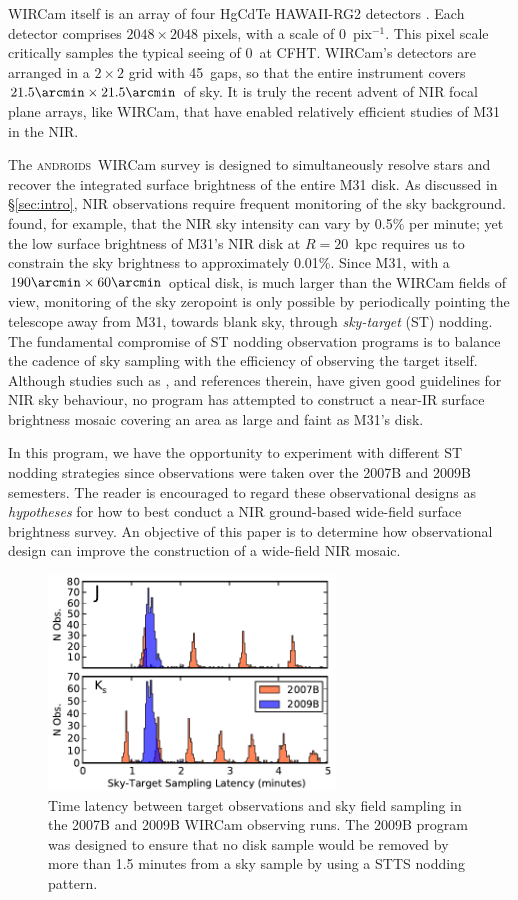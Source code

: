 \documentclass[iop]{emulateapj}
\newcommand{\androids}{\textsc{androids}}
\newcommand{\Sec}[1]{\S\ref{sec:#1}}  %
\begin{document}
WIRCam itself is an array of four HgCdTe HAWAII-RG2 detectors \citep{Puget:2004}.
Each detector comprises $2048\times 2048$ pixels, with a scale of 0~pix$^{-1}$.
This pixel scale critically samples the typical seeing of 0~at CFHT\@.
WIRCam's detectors are arranged in a $2\times 2$ grid with 45\arcsec~gaps, so that the entire instrument covers $21.5\arcmin \times 21.5\arcmin$ of sky.
It is truly the recent advent of NIR focal plane arrays, like WIRCam, that have enabled relatively efficient studies of M31 in the NIR.

The \androids\ WIRCam survey is designed to simultaneously resolve stars and recover the integrated surface brightness of the entire M31 disk.
As discussed in \Sec{intro}, NIR observations require frequent monitoring of the sky background.
\cite{Vaduvescu:2004} found, for example, that the NIR sky intensity can vary by 0.5\% per minute; yet the low surface brightness of M31's NIR disk at $R=20$~kpc requires us to constrain the sky brightness to approximately 0.01\%.
Since M31, with a $190\arcmin \times 60\arcmin$ optical disk, is much larger than the WIRCam fields of view, monitoring of the sky zeropoint is only possible by periodically pointing the telescope away from M31, towards blank sky, through \emph{sky-target} (ST) nodding. 
The fundamental compromise of ST nodding observation programs is to balance the cadence of sky sampling with the efficiency of observing the target itself.
Although studies such as \cite{Vaduvescu:2004}, and references therein, have given good guidelines for NIR sky behaviour, no program has attempted to construct a near-IR surface brightness mosaic covering an area as large and faint as M31's disk.

In this program, we have the opportunity to experiment with different ST nodding strategies since observations were taken over the 2007B and 2009B semesters.
The reader is encouraged to regard these observational designs as \emph{hypotheses} for how to best conduct a NIR ground-based wide-field surface brightness survey.
An objective of this paper is to determine how observational design can improve the construction of a wide-field NIR mosaic.

\begin{figure}[t]
\centering
\includegraphics[width=3in]{figs/sky_target_lag}
\caption{Time latency between target observations and sky field sampling in the 2007B and 2009B WIRCam observing runs.
The 2009B program was designed to ensure that no disk sample would be removed by more than 1.5 minutes from a sky sample by using a STTS nodding pattern.}
\label{fig:sky_target_lag}
\end{figure}
\end{document}
